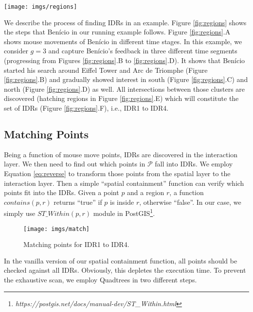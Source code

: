 \begin{figure*}[t]
\centering
   \texttt{[image: imgs/regions]}
  \caption{The process of finding IDRs on Airbnb dataset.}
  \label{fig:regions}
\end{figure*}

\vspace{2pt}
We describe the process of finding IDRs in an example. Figure \ref{fig:regions} shows the steps that Ben\'icio in our running example follows. Figure \ref{fig:regions}.A shows mouse movements of Ben\'icio in different time stages. In this example, we consider $g = 3$ and capture Ben\'icio's feedback in three different time segments (progressing from Figures \ref{fig:regions}.B to \ref{fig:regions}.D). It shows that Ben\'icio started his search around Eiffel Tower and Arc de Triomphe (Figure \ref{fig:regions}.B) and gradually showed interest in south (Figure \ref{fig:regions}.C) and north (Figure \ref{fig:regions}.D) as well. All intersections between those clusters are discovered (hatching regions in Figure \ref{fig:regions}.E) which will constitute the set of IDRs (Figure \ref{fig:regions}.F), i.e., IDR1 to IDR4.

\subsection{Matching Points}
Being a function of mouse move points, IDRs are discovered in the interaction layer. We then need to find out which points in $\mathcal{P}$ fall into IDRs. We employ Equation \ref{eq:reverse} to transform those points from the spatial layer to the interaction layer. Then a simple ``spatial containment'' function can verify which points fit into the IDRs. Given a point $p$ and a region $r$, a function $\mathit{contains}(p,r)$ returns ``true'' if $p$ is inside $r$, otherwise ``false''. In our case, we simply use $\mathit{ST\_Within}(p,r)$ module in PostGIS\footnote{\it https://postgis.net/docs/manual-dev/ST_Within.html}.

\begin{figure}[t]
\centering
   \texttt{[image: imgs/match]}
  \caption{Matching points for IDR1 to IDR4.}
  \label{fig:match}
\end{figure}

\vspace{2pt}
In the vanilla version of our spatial containment function, all points should be checked against all IDRs. Obviously, this depletes the execution time. To prevent the exhaustive scan, we employ Quadtrees in two different steps.

